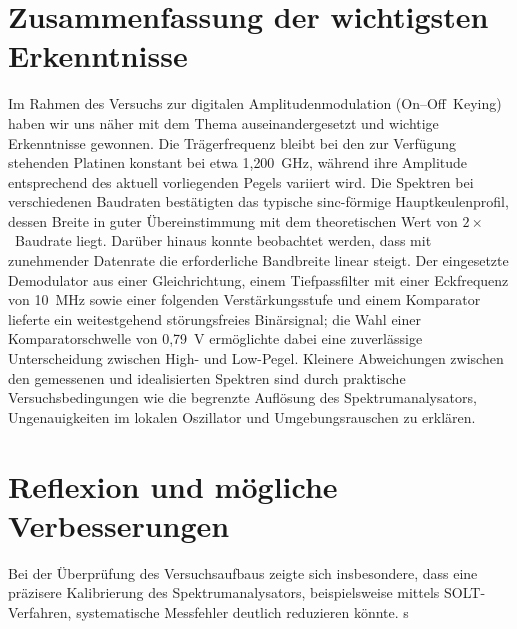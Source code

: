 \section{Zusammenfassung der wichtigsten Erkenntnisse}
Im Rahmen des Versuchs zur digitalen Amplitudenmodulation (On--Off~Keying) haben wir uns näher mit dem Thema auseinandergesetzt und wichtige Erkenntnisse gewonnen. Die Trägerfrequenz bleibt bei den zur Verfügung stehenden Platinen konstant bei etwa 1{,}200~GHz, während ihre Amplitude entsprechend des aktuell vorliegenden Pegels variiert wird.
Die Spektren bei verschiedenen Baudraten bestätigten das typische sinc-förmige Hauptkeulenprofil, dessen Breite in guter Übereinstimmung mit dem theoretischen Wert von $2 \times$~Baudrate liegt. 
Darüber hinaus konnte beobachtet werden, dass mit zunehmender Datenrate die erforderliche Bandbreite linear steigt.
Der eingesetzte Demodulator aus einer Gleichrichtung, einem Tiefpassfilter mit einer Eckfrequenz von 10~MHz sowie einer folgenden Verstärkungsstufe und einem Komparator lieferte ein weitestgehend störungsfreies Binärsignal; die Wahl einer Komparatorschwelle von 0,79~V ermöglichte dabei eine zuverlässige Unterscheidung zwischen High- und Low-Pegel. Kleinere Abweichungen zwischen den gemessenen und idealisierten Spektren sind durch praktische Versuchsbedingungen wie die begrenzte Auflösung des Spektrumanalysators, Ungenauigkeiten im lokalen Oszillator und Umgebungsrauschen zu erklären.

\section{Reflexion und mögliche Verbesserungen}
Bei der Überprüfung des Versuchsaufbaus zeigte sich insbesondere, dass eine präzisere Kalibrierung des Spektrumanalysators, beispielsweise mittels SOLT-Verfahren, systematische Messfehler deutlich reduzieren könnte.  s 
\clearpage